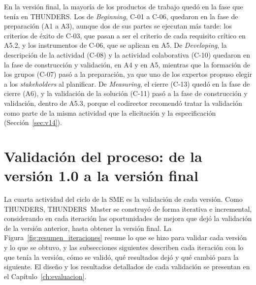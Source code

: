 \documentclass[12pt,letterpaper,oneside]{report}
\begin{document}
En la versión final, la mayoría de los productos de trabajo quedó en la fase que tenía
en THUNDERS. Los de \textit{Beginning}, C-01 a C-06, quedaron en la fase de
preparación (A1 a A3), aunque dos de sus partes se ejecutan más tarde: los
criterios de éxito de C-03, que pasan a ser el criterio de cada requisito
crítico en A5.2, y los instrumentos de C-06, que se aplican en A5. De
\textit{Developing}, la descripción de la actividad (C-08) y la actividad
colaborativa (C-10) quedaron en la fase de construcción y validación, en A4 y
en A5, mientras que la formación de los grupos (C-07) pasó a la preparación, ya
que uno de los expertos propuso elegir a los \textit{stakeholders} al
planificar. De \textit{Measuring}, el cierre (C-13) quedó en la
fase de cierre (A6), y la validación de la solución (C-11) pasó a la fase de
construcción y validación, dentro de A5.3, porque el codirector recomendó
tratar la validación como parte de la misma actividad que la elicitación y la
especificación (Sección~\ref{sec:v14}).

\section{Validación del proceso: de la versión 1.0 a la versión final}
\label{sec:iteraciones}
La cuarta actividad del ciclo de la SME es la validación de cada versión. Como THUNDERS,
THUNDERS~Master se construyó de forma iterativa e incremental, considerando en
cada iteración las oportunidades de mejora que dejó la validación de la versión anterior,
hasta obtener la versión final. La Figura~\ref{fig:resumen_iteraciones} resume
lo que se hizo para validar cada versión y lo que se obtuvo, y las subsecciones
siguientes describen cada iteración con lo que tenía la versión, cómo se validó,
qué resultados dejó y qué cambió para la siguiente. El diseño y los resultados
detallados de cada validación se presentan en el Capítulo~\ref{ch:evaluacion}.
\end{document}

